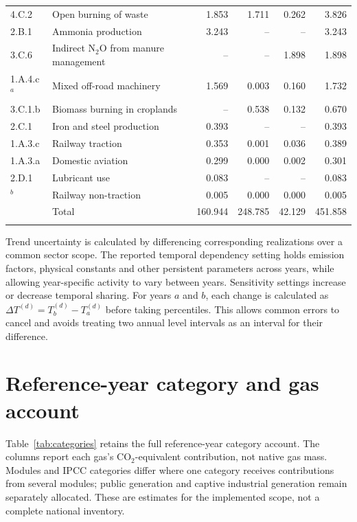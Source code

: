 \documentclass[essd]{copernicus}
\begin{document}
\begin{table}[t]
\begin{tabular}{lp{}rrrr}
4.C.2 & Open burning of waste & 1.853 & 1.711 & 0.262 & 3.826 \\
2.B.1 & Ammonia production & 3.243 & -- & -- & 3.243 \\
3.C.6 & Indirect N$_2$O from manure management & -- & -- & 1.898 & 1.898 \\
1.A.4.c$^{a}$ & Mixed off-road machinery & 1.569 & 0.003 & 0.160 & 1.732 \\
3.C.1.b & Biomass burning in croplands & -- & 0.538 & 0.132 & 0.670 \\
2.C.1 & Iron and steel production & 0.393 & -- & -- & 0.393 \\
1.A.3.c & Railway traction & 0.353 & 0.001 & 0.036 & 0.389 \\
1.A.3.a & Domestic aviation & 0.299 & 0.000 & 0.002 & 0.301 \\
2.D.1 & Lubricant use & 0.083 & -- & -- & 0.083 \\
$^{b}$ & Railway non-traction & 0.005 & 0.000 & 0.000 & 0.005 \\
\middlehline
 & Total & 160.944 & 248.785 & 42.129 & 451.858 \\
\bottomhline
\end{tabular}
\end{table}

Trend uncertainty is calculated by differencing corresponding realizations over a common sector scope. The reported temporal dependency setting holds emission factors, physical constants and other persistent parameters across years, while allowing year-specific activity to vary between years. Sensitivity settings increase or decrease temporal sharing. For years $a$ and $b$, each change is calculated as $\Delta T^{(d)}=T_b^{(d)}-T_a^{(d)}$ before taking percentiles. This allows common errors to cancel and avoids treating two annual level intervals as an interval for their difference.



\section{Reference-year category and gas account}
\label{sec:category_account}

Table~\ref{tab:categories} retains the full reference-year category account. The columns report each gas's CO$_2$-equivalent contribution, not native gas mass. Modules and IPCC categories differ where one category receives contributions from several modules; public generation and captive industrial generation remain separately allocated. These are estimates for the implemented scope, not a complete national inventory.
\end{document}
